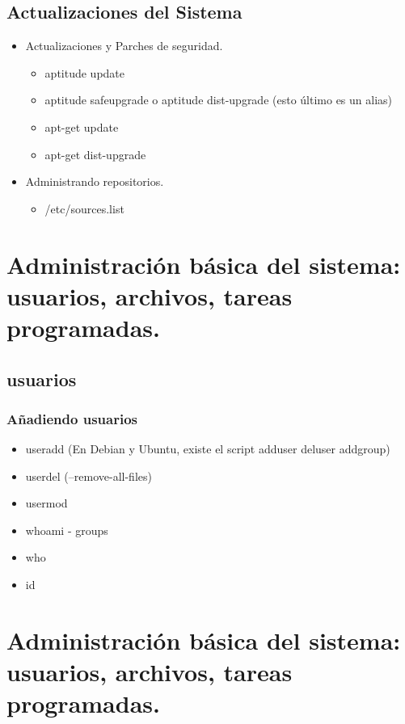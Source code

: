\documentclass{beamer}
\begin{document}
\subsection{Actualizaciones del Sistema}
\begin{frame}
\begin{itemize}
\frametitle{Actualizaciones del Sistema}
\item Actualizaciones y Parches de seguridad.
	\begin{itemize}
		\item \alert {aptitude update}
		\item aptitude safeupgrade o aptitude dist-upgrade (esto último es un alias)
                \item apt-get update
		\item apt-get dist-upgrade
        \end{itemize}
\item Administrando repositorios.
        \begin{itemize}
                \item /etc/sources.list
        \end{itemize}
\end{itemize}
\end{frame}

\section{Administraci\'on b\'asica del sistema: usuarios, archivos, tareas programadas. }
\subsection{usuarios}
\begin{frame}
\frametitle{A\~nadiendo usuarios}
\begin{itemize}
\item useradd (En Debian y Ubuntu, existe el script adduser deluser addgroup)
\item userdel (--remove-all-files) 
\item usermod
\item whoami - groups
\item who
\item id
\end{itemize}
\end{frame}

\section{Administraci\'on b\'asica del sistema: usuarios, archivos, tareas programadas. }
\end{document}
